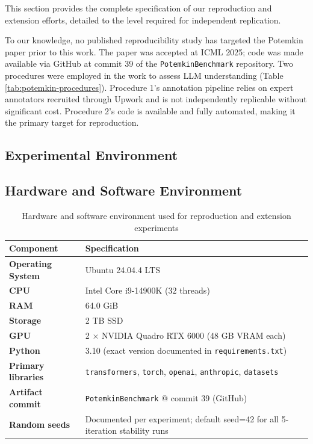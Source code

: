 \documentclass[sigconf,authordraft]{acmart}
\begin{document}
This section provides the complete specification of our reproduction and extension efforts, detailed to the level required for independent replication.

To our knowledge, no published reproducibility study has targeted the Potemkin paper prior to this work. The paper was accepted at ICML 2025; code was made available via GitHub at commit 39 of the \texttt{PotemkinBenchmark} repository. Two procedures were employed in the work to assess LLM understanding (Table \ref{tab:potemkin-procedures}).  Procedure 1's annotation pipeline relies on expert annotators recruited through Upwork and is not independently replicable without significant cost. Procedure 2's code is available and fully automated, making it the primary target for reproduction.

\subsection{Experimental Environment}

\subsection{Hardware and Software Environment}

\begin{table}[t]
\small
\centering
\setlength{\tabcolsep}{4pt}
\renewcommand{\arraystretch}{1.15}


\begin{tabularx}{\columnwidth}{>{\bfseries}l X}
\toprule
Component & Specification \\
\midrule
Operating System & Ubuntu 24.04.4 LTS \\
CPU & Intel Core i9-14900K ($32$ threads) \\
RAM & 64.0 GiB \\
Storage & 2 TB SSD \\
GPU & 2 $\times$ NVIDIA Quadro RTX 6000 (48 GB VRAM each) \\
Python & 3.10 (exact version documented in \texttt{requirements.txt}) \\
Primary libraries & \texttt{transformers}, \texttt{torch}, \texttt{openai}, \texttt{anthropic}, \texttt{datasets} \\
Artifact commit & \texttt{PotemkinBenchmark} @ commit 39 (GitHub) \\
Random seeds & Documented per experiment; default seed=42 for all 5-iteration stability runs \\
\bottomrule
\end{tabularx}

\caption{Hardware and software environment used for reproduction and extension experiments}
\label{tab:hardware-environment}
\end{table}
\end{document}
